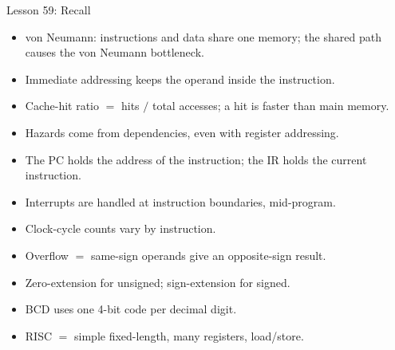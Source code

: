 \documentclass[aspectratio=169]{beamer}
\begin{document}
\begin{frame}{Lesson 59: Recall}
  \begin{itemize}
    \item von Neumann: instructions and data share one memory; the shared
      path causes the von Neumann bottleneck.
    \item Immediate addressing keeps the operand inside the instruction.
    \item Cache-hit ratio $=$ hits $/$ total accesses; a hit is faster than
      main memory.
    \item Hazards come from dependencies, even with register addressing.
    \item The PC holds the address of the  instruction; the IR
      holds the current instruction.
    \item Interrupts are handled at instruction boundaries, mid-program.
    \item Clock-cycle counts vary by instruction.
    \item Overflow $=$ same-sign operands give an opposite-sign result.
    \item Zero-extension for unsigned; sign-extension for signed.
    \item BCD uses one 4-bit code per decimal digit.
    \item RISC $=$ simple fixed-length, many registers, load/store.
  \end{itemize}
\end{frame}
\end{document}
